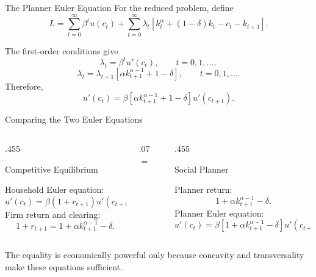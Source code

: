 \documentclass[11pt,aspectratio=169,c]{beamer}
\begin{document}
\begin{frame}{The Planner Euler Equation}
  For the reduced problem, define
  \[
    L=
    \sum_{t=0}^{\infty}\beta^t u(c_t)
    +
    \sum_{t=0}^{\infty}
    \lambda_t
    \left[
      k_t^\alpha+(1-\delta)k_t-c_t-k_{t+1}
    \right].
  \]

  The first-order conditions give
  \[
    \lambda_t=\beta^t u'(c_t),
    \qquad t=0,1,\ldots,
  \]
  \[
    \lambda_t
    =
    \lambda_{t+1}
    \left[
      \alpha k_{t+1}^{\alpha-1}+1-\delta
    \right],
    \qquad t=0,1,\ldots.
  \]
  Therefore,
  \[
    \boxed{
      u'(c_t)
      =
      \beta
      \left[
        \alpha k_{t+1}^{\alpha-1}+1-\delta
      \right]
      u'(c_{t+1}).
    }
  \]
\end{frame}

\begin{frame}{Comparing the Two Euler Equations}
  \begin{columns}[c,onlytextwidth]
    \begin{column}{.455\textwidth}
      \begin{block}{Competitive Equilibrium}
        \begin{minipage}[t][3.15cm][t]{\dimexpr\linewidth-.76em\relax}
          Household Euler equation:
          \[
            u'(c_t)=\beta(1+r_{t+1})u'(c_{t+1}).
          \]
          Firm return and clearing:
          \[
            1+r_{t+1}
            =
            1+\alpha k_{t+1}^{\alpha-1}-\delta.
          \]
        \end{minipage}
      \end{block}
    \end{column}
    \begin{column}{.07\textwidth}
      \centering
      \Large\textcolor{slidegreen}{$=$}
    \end{column}
    \begin{column}{.455\textwidth}
      \begin{block}{Social Planner}
        \begin{minipage}[t][3.15cm][t]{\dimexpr\linewidth-.76em\relax}
          Planner return:
          \[
            1+\alpha k_{t+1}^{\alpha-1}-\delta.
          \]
          Planner Euler equation:
          \[
            u'(c_t)
            =
            \beta
            \left[
              1+\alpha k_{t+1}^{\alpha-1}-\delta
            \right]
            u'(c_{t+1}).
          \]
        \end{minipage}
      \end{block}
    \end{column}
  \end{columns}

  \vspace{.25em}
  The equality is economically powerful only because concavity and
  transversality make these equations sufficient.
\end{frame}
\end{document}
